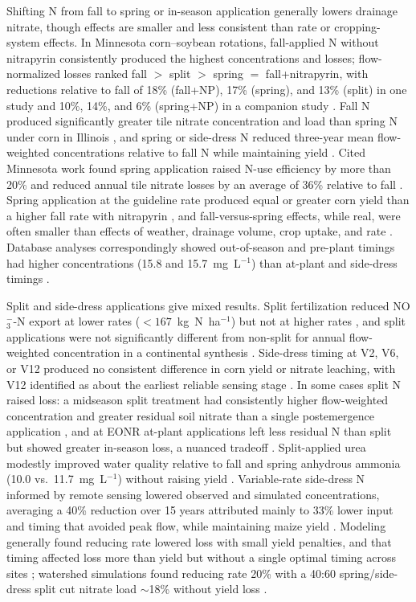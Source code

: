 \documentclass[11pt]{article}
\begin{document}
Shifting N from fall to spring or in-season application generally lowers drainage nitrate, though effects are smaller and less consistent than rate or cropping-system effects. In Minnesota corn--soybean rotations, fall-applied N without nitrapyrin consistently produced the highest concentrations and losses; flow-normalized losses ranked fall $>$ split $>$ spring $=$ fall+nitrapyrin, with reductions relative to fall of 18\% (fall+NP), 17\% (spring), and 13\% (split) in one study \parencite{Randall2003} and 10\%, 14\%, and 6\% (spring+NP) in a companion study \parencite{Randall2005}. Fall N produced significantly greater tile nitrate concentration and load than spring N under corn in Illinois \parencite{Gentry2024}, and spring or side-dress N reduced three-year mean flow-weighted concentrations relative to fall N while maintaining yield \parencite{Pittelkow2017}. Cited Minnesota work found spring application raised N-use efficiency by more than 20\% and reduced annual tile nitrate losses by an average of 36\% relative to fall \parencite{Dinnes2002}. Spring application at the guideline rate produced equal or greater corn yield than a higher fall rate with nitrapyrin \parencite{Vetsch2019}, and fall-versus-spring effects, while real, were often smaller than effects of weather, drainage volume, crop uptake, and rate \parencite{Liu2021}. Database analyses correspondingly showed out-of-season and pre-plant timings had higher concentrations (15.8 and 15.7~mg~L$^{-1}$) than at-plant and side-dress timings \parencite{Hertzberger2019}.

Split and side-dress applications give mixed results. Split fertilization reduced NO$_3^-$-N export at lower rates ($<167$~kg~N~ha$^{-1}$) but not at higher rates \parencite{Liu2021}, and split applications were not significantly different from non-split for annual flow-weighted concentration in a continental synthesis \parencite{Hertzberger2019}. Side-dress timing at V2, V6, or V12 produced no consistent difference in corn yield or nitrate leaching, with V12 identified as about the earliest reliable sensing stage \parencite{Jaynes2013}. In some cases split N raised loss: a midseason split treatment had consistently higher flow-weighted concentration and greater residual soil nitrate than a single postemergence application \parencite{Jaynes2006}, and at EONR at-plant applications left less residual N than split but showed greater in-season loss, a nuanced tradeoff \parencite{Bandura2025}. Split-applied urea modestly improved water quality relative to fall and spring anhydrous ammonia (10.0 vs.\ 11.7~mg~L$^{-1}$) without raising yield \parencite{Waring2022}. Variable-rate side-dress N informed by remote sensing lowered observed and simulated concentrations, averaging a 40\% reduction over 15 years attributed mainly to 33\% lower input and timing that avoided peak flow, while maintaining maize yield \parencite{Wilson2020b}. Modeling generally found reducing rate lowered loss with small yield penalties, and that timing affected loss more than yield but without a single optimal timing across sites \parencite{Jeong2018}; watershed simulations found reducing rate 20\% with a 40:60 spring/side-dress split cut nitrate load $\sim$18\% without yield loss \parencite{Singh2023}.
\end{document}
